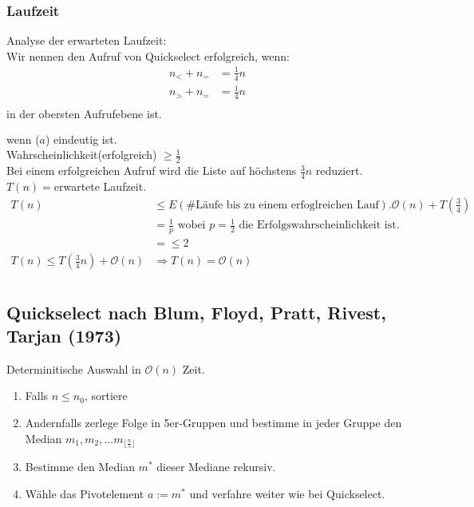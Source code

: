 \subsubsection{Laufzeit}
Analyse der erwarteten Laufzeit:\\
Wir nennen den Aufruf von Quickselect erfolgreich, wenn:
\begin{align*}
n_< + n_= &= \frac{1}{4	}n\\
n_> + n_= &= \frac{1}{4	}n\\
\end{align*}
in der obersten Aufrufebene ist.\\
\begin{align*}
[\frac{1}{4}n \leq \text{rang}(a) \leq \frac{3}{4}n]\\
\end{align*}
wenn ($a$) eindeutig ist.\\
Wahrscheinlichkeit(erfolgreich) $\geq \frac{1}{2}$\\
Bei einem erfolgreichen Aufruf wird die Liste auf höchstens $\frac{3}{4}n$ reduziert.\\
$T(n)=$erwartete Laufzeit.\\
\begin{align*}
T(n)&\leq E(\#\text{Läufe bis zu einem erfoglreichen Lauf}).\mathcal{O}(n) + T(\frac{3}{4})\\
&= \frac{1}{p} \text{ wobei } p = \frac{1}{2} \text{ die Erfolgswahrscheinlichkeit ist.}\\
&= \leq 2\\
T(n) \leq T(\frac{3}{4}n) + \mathcal{O}(n) &\Rightarrow T(n) = \mathcal{O}(n)\\
\end{align*}
\subsection{Quickselect nach Blum, Floyd, Pratt, Rivest, Tarjan (1973)}
Determinitische Auswahl in $\mathcal{O}(n)$ Zeit.\\
\begin{enumerate}
\item Falls $n\leq n_0$, sortiere\\
\item Andernfalls zerlege Folge in 5er-Gruppen und bestimme in jeder Gruppe den Median $m_1,m_2,...m_{\lfloor \frac{n}{5} \rfloor}$\\
\item Bestimme den Median $m^*$ dieser Mediane rekursiv.\\
\item Wähle das Pivotelement $a := m^*$ und verfahre weiter wie bei Quickselect.
\end{enumerate}
